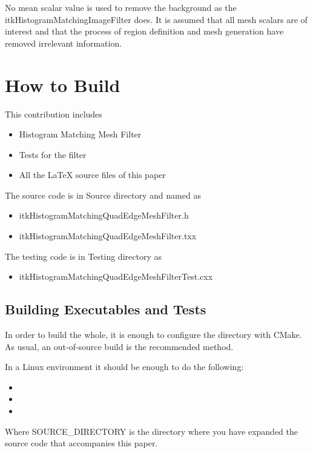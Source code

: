 \documentclass{InsightArticle}
\begin{document}
No mean scalar value is used to remove the background
as the itkHistogramMatchingImageFilter does. It is 
assumed that all mesh scalars are of interest and that the
process of region definition and mesh generation
have removed irrelevant information.

\section{How to Build}

This contribution includes

\begin{itemize}
\item Histogram Matching Mesh Filter
\item Tests for the filter
\item All the LaTeX source files of this paper
\end{itemize}

The source code is in Source directory and named as 

\begin{itemize}
\item itkHistogramMatchingQuadEdgeMeshFilter.h
\item itkHistogramMatchingQuadEdgeMeshFilter.txx
\end{itemize}

The testing code is in Testing directory as

\begin{itemize}
\item itkHistogramMatchingQuadEdgeMeshFilterTest.cxx
\end{itemize}

\subsection{Building Executables and Tests}

In order to build the whole, it is enough to configure the directory with
CMake. As usual, an out-of-source build is the recommended method.

In a Linux environment it should be enough to do the following:

\begin{itemize}
\item {}
\item {}
\item {}
\end{itemize}

Where SOURCE\_DIRECTORY is the directory where you have expanded the source
code that accompanies this paper.
\end{document}

